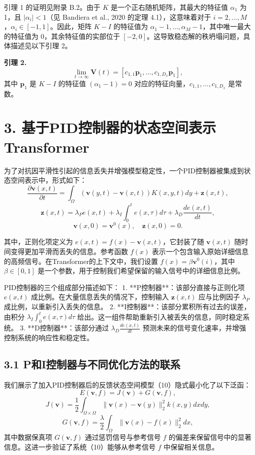 \documentclass[lang=cn,a4paper,newtx]{elegantpaper}
\begin{document}
引理 1 的证明见附录 B.2。由于 $K$ 是一个正右随机矩阵，其最大的特征值 $\alpha_1$ 为 1，且 $\lvert \alpha_i \rvert < 1$（见 Bandiera et al., 2020 的定理 4.1），这意味着对于 $i = 2, \dots, M$，$\alpha_i \in [-1, 1]$。因此，矩阵 $K - I$ 的特征值为 $\alpha_1 - 1, \dots, \alpha_M - 1$，其中唯一最大的特征值为 0，其余特征值的实部位于 $[-2, 0]$。这导致稳态解的秩坍塌问题，具体描述见以下引理 2。

\textbf{引理 2.} 
\[
\lim_{t \to \infty} \mathbf{V}(t) = [c_{1,1}\mathbf{p}_1, \dots, c_{1, D_x}\mathbf{p}_1],
\]
其中 $\mathbf{p}_1$ 是 $K - I$ 的特征值 $(\alpha_1 - 1) = 0$ 对应的特征向量，$c_{1,1}, \dots, c_{1,D_x}$ 是常数。

\section*{3. 基于PID控制器的状态空间表示Transformer}

为了对抗因平滑性引起的信息丢失并增强模型稳定性，一个PID控制器被集成到状态空间表示中，形式如下：
\[
\frac{\partial \mathbf{v}(x, t)}{\partial t} =
\int_\Omega (\mathbf{v}(y, t) - \mathbf{v}(x, t)) K(x, y, t) dy + \mathbf{z}(x, t),
\]
\[
\mathbf{z}(x, t) = \lambda_P e(x, t) + \lambda_I \int_0^t e(x, \tau) d\tau + \lambda_D \frac{d e(x, t)}{d t},
\]
\[
\mathbf{v}(x, 0) = \mathbf{v}^0(x), \quad \mathbf{z}(x, 0) = 0. \tag{10}
\]

其中，正则化项定义为 $e(x, t) = f(x) - \mathbf{v}(x, t)$，它封装了随 $\mathbf{v}(x, t)$ 随时间变得更加平滑而丢失的信息。参考函数 $f(x)$ 表示一个包含输入原始详细信息的高频信号。在Transformer的上下文中，我们设置 $f(x) = \beta \mathbf{v}^0(i)$，其中 $\beta \in [0, 1]$ 是一个参数，用于控制我们希望保留的输入信号中的详细信息比例。

PID控制器的三个组成部分描述如下：
1. **P控制器**：该部分直接与正则化项 $e(x, t)$ 成比例。在大量信息丢失的情况下，控制输入 $\mathbf{z}(x, t)$ 应与比例因子 $\lambda_P$ 成比例，以重新引入丢失的信息。
2. **I控制器**：该部分累积所有过去的误差，由积分 $\lambda_I \int_0^t e(x, \tau) d\tau$ 给出。这一组件帮助重新引入被丢失的信息，同时稳定系统。
3. **D控制器**：该部分通过 $ \lambda_D \frac{d e(x, t)}{d t}$ 预测未来的信号变化速率，并增强控制系统的响应性和稳定性。

\subsection*{3.1 P和I控制器与不同优化方法的联系}

我们展示了加入PID控制器后的反馈状态空间模型（10）隐式最小化了以下泛函：
\[
E(\mathbf{v}, f) = J(\mathbf{v}) + G(\mathbf{v}, f),
\]
\[
J(\mathbf{v}) = \frac{1}{2} \int_{\Omega \times \Omega} \|\mathbf{v}(x) - \mathbf{v}(y)\|_2^2 k(x, y) dx dy,
\]
\[
G(\mathbf{v}, f) = \frac{\lambda}{2} \int_\Omega \|\mathbf{v}(x) - f(x)\|_2^2 dx,
\]
其中数据保真项 $G(\mathbf{v}, f)$ 通过惩罚信号与参考信号 $f$ 的偏差来保留信号中的显著信息。这进一步验证了系统（10）能够从参考信号 $f$ 中保留相关信息。
\end{document}
